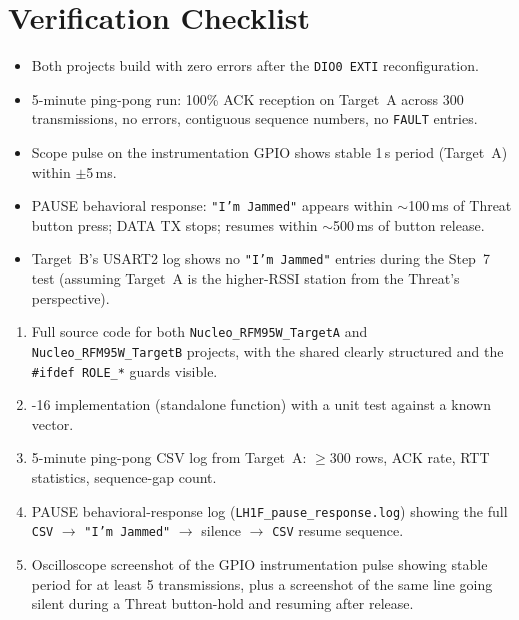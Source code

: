 \documentclass[11pt,letterpaper]{article}
\begin{document}

\newpage
\section{Verification Checklist}
\begin{itemize}[leftmargin=2em]
	\item[$\square$] Both projects build with zero errors after the \texttt{DIO0 EXTI} reconfiguration.
	\item[$\square$] 5-minute ping-pong run: 100\% ACK reception on Target~A across 300 transmissions, no \CRC{} errors, contiguous sequence numbers, no \texttt{FAULT} entries.
	\item[$\square$] Scope pulse on the instrumentation \mbox{GPIO} shows stable 1\,s period (Target~A) within $\pm$5\,ms.
	\item[$\square$] PAUSE behavioral response: \texttt{"I'm Jammed"} appears within $\sim$100\,ms of Threat button press; DATA TX stops; resumes within $\sim$500\,ms of button release.
	\item[$\square$] Target~B's USART2 log shows no \texttt{"I'm Jammed"} entries during the Step~7 test (assuming Target~A is the higher-RSSI station from the Threat's perspective).
\end{itemize}

\begin{tcolorbox}[deliverable={Lab Handout 1-F Deliverable}]
	\begin{enumerate}[leftmargin=1.2em]
		\item Full source code for both \texttt{Nucleo\_RFM95W\_TargetA} and \texttt{Nucleo\_RFM95W\_TargetB} projects, with the shared \FSM{} clearly structured and the \texttt{\#ifdef ROLE\_*} guards visible.
		\item \CRC{}-16 implementation (standalone function) with a unit test against a known vector.
		\item 5-minute ping-pong CSV log from Target~A: $\geq$300 rows, ACK rate, RTT statistics, sequence-gap count.
		\item PAUSE behavioral-response log (\texttt{LH1F\_pause\_response.log}) showing the full \texttt{CSV} $\to$ \texttt{"I'm Jammed"} $\to$ silence $\to$ \texttt{CSV} resume sequence.
		\item Oscilloscope screenshot of the \mbox{GPIO} instrumentation pulse showing stable period for at least 5 transmissions, plus a screenshot of the same line going silent during a Threat button-hold and resuming after release.
	\end{enumerate}
\end{tcolorbox}

\printhandoutglossary
\end{document}
